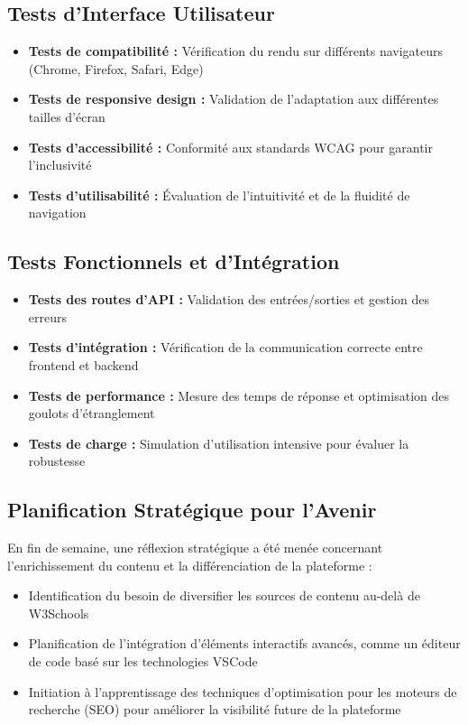\subsection{Tests d'Interface Utilisateur}

\begin{itemize}
  \item \textbf{Tests de compatibilité :} Vérification du rendu sur différents navigateurs (Chrome, Firefox, Safari, Edge)
  \item \textbf{Tests de responsive design :} Validation de l'adaptation aux différentes tailles d'écran
  \item \textbf{Tests d'accessibilité :} Conformité aux standards WCAG pour garantir l'inclusivité
  \item \textbf{Tests d'utilisabilité :} Évaluation de l'intuitivité et de la fluidité de navigation
\end{itemize}

\subsection{Tests Fonctionnels et d'Intégration}

\begin{itemize}
  \item \textbf{Tests des routes d'API :} Validation des entrées/sorties et gestion des erreurs
  \item \textbf{Tests d'intégration :} Vérification de la communication correcte entre frontend et backend
  \item \textbf{Tests de performance :} Mesure des temps de réponse et optimisation des goulots d'étranglement
  \item \textbf{Tests de charge :} Simulation d'utilisation intensive pour évaluer la robustesse
\end{itemize}

\subsection{Planification Stratégique pour l'Avenir}

En fin de semaine, une réflexion stratégique a été menée concernant l'enrichissement du contenu et la différenciation de la plateforme :

\begin{itemize}
  \item Identification du besoin de diversifier les sources de contenu au-delà de W3Schools
  \item Planification de l'intégration d'éléments interactifs avancés, comme un éditeur de code basé sur les technologies VSCode
  \item Initiation à l'apprentissage des techniques d'optimisation pour les moteurs de recherche (SEO) pour améliorer la visibilité future de la plateforme
\end{itemize}

